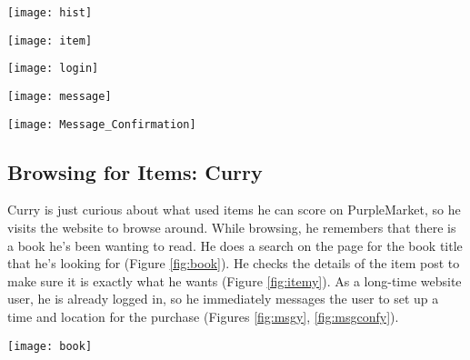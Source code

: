 \pagebreak

\vspace{5mm}
\begin{center}
\label{fig:notes}
\texttt{[image: hist]}
\end{center}

\begin{center}
\label{fig:itema}
\texttt{[image: item]}
\end{center}

\pagebreak

\begin{center}
\label{fig:logina}
\texttt{[image: login]}
\end{center}

\begin{center}
\label{fig:msga}
\texttt{[image: message]}
\end{center}

\pagebreak

\begin{center}
\label{fig:msgconfa}
\texttt{[image: Message\_Confirmation]}
\end{center}

\subsection{Browsing for Items: Curry}
Curry is just curious about what used items he can score on PurpleMarket, so he visits the website to browse around.  While browsing, he remembers that there is a book he's been wanting to read.  He does a search on the page for the book title that he's looking for (Figure \ref{fig:book}). He checks the details of the item post to make sure it is exactly what he wants (Figure \ref{fig:itemy}).  As a long-time website user, he is already logged in, so he immediately messages the user to set up a time and location for the purchase (Figures \ref{fig:msgy}, \ref{fig:msgconfy}).

\pagebreak

\vspace{5mm}
\begin{center}
\label{fig:book}
\texttt{[image: book]}
\end{center}

